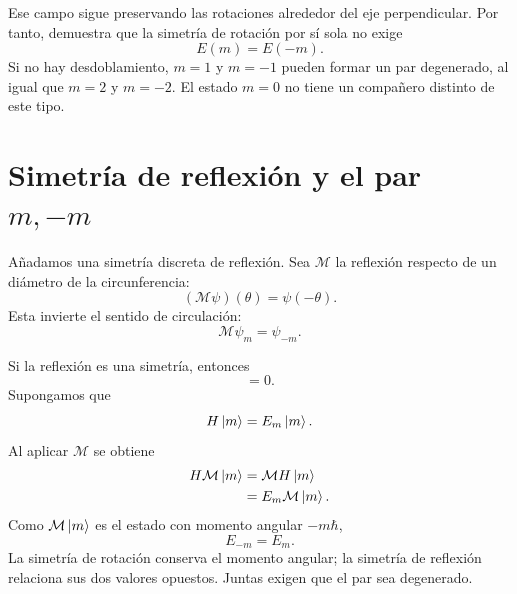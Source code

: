 Ese campo sigue preservando las rotaciones alrededor del eje perpendicular. Por tanto, demuestra que la simetría de rotación por sí sola no exige
\begin{equation}
E(m)=E(-m).
\end{equation}
Si no hay desdoblamiento, \(m=1\) y \(m=-1\) pueden formar un par degenerado, al igual que \(m=2\) y \(m=-2\). El estado \(m=0\) no tiene un compañero distinto de este tipo.

\section{Simetría de reflexión y el par \texorpdfstring{\(m,-m\)}{m, -m}}

Añadamos una simetría discreta de reflexión. Sea \(\mathcal M\) la reflexión respecto de un diámetro de la circunferencia:
\begin{equation}
(\mathcal M\psi)(\theta)=\psi(-\theta).
\end{equation}
Esta invierte el sentido de circulación:
\begin{equation}
\mathcal M\psi_m=\psi_{-m}.
\end{equation}

Si la reflexión es una simetría, entonces
\begin{equation}
[\mathcal M,H]=0.
\end{equation}
Supongamos que
\begin{equation}
H\left\lvert m\right\rangle=E_m\left\lvert m\right\rangle.
\end{equation}
Al aplicar \(\mathcal M\) se obtiene
\begin{align}
H\mathcal M\left\lvert m\right\rangle
&=\mathcal M H\left\lvert m\right\rangle\\
&=E_m\mathcal M\left\lvert m\right\rangle.
\end{align}
Como \(\mathcal M\left\lvert m\right\rangle\) es el estado con momento angular \(-m\hbar\),
\begin{equation}
E_{-m}=E_m.
\end{equation}
La simetría de rotación conserva el momento angular; la simetría de reflexión relaciona sus dos valores opuestos. Juntas exigen que el par sea degenerado.

\begin{classroomqa}
\end{classroomqa}

